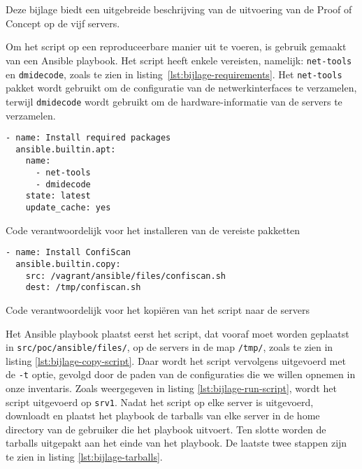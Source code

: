 
\chapter{}
\label{ch:bijlage_poc_uitvoering}

Deze bijlage biedt een uitgebreide beschrijving van de uitvoering van de Proof of Concept op de vijf servers.

Om het script op een reproduceerbare manier uit te voeren, is gebruik gemaakt van een Ansible playbook.
Het script heeft enkele vereisten, namelijk: \texttt{net-tools} en \texttt{dmidecode}, zoals te zien in listing~\ref{lst:bijlage-requirements}.
Het \texttt{net-tools} pakket wordt gebruikt om de configuratie van de netwerkinterfaces te verzamelen, terwijl \texttt{dmidecode} wordt gebruikt om de hardware-informatie van de servers te verzamelen.

\begin{listing}
  \begin{verbatim}
- name: Install required packages
  ansible.builtin.apt:
    name:
      - net-tools
      - dmidecode
    state: latest
    update_cache: yes
  \end{verbatim}
  \caption{Code verantwoordelijk voor het installeren van de vereiste pakketten}
  \label{lst:bijlage-requirements}
\end{listing}

\begin{listing}
  \begin{verbatim}
- name: Install ConfiScan
  ansible.builtin.copy:
    src: /vagrant/ansible/files/confiscan.sh
    dest: /tmp/confiscan.sh
  \end{verbatim}
  \caption{Code verantwoordelijk voor het kopiëren van het script naar de servers}
  \label{lst:bijlage-copy-script}
\end{listing}

Het Ansible playbook plaatst eerst het script, dat vooraf moet worden geplaatst in \texttt{src/poc/ansible/files/}, op de servers in de map \texttt{/tmp/}, zoals te zien in listing \ref{lst:bijlage-copy-script}.
Daar wordt het script vervolgens uitgevoerd met de \texttt{-t} optie, gevolgd door de paden van de configuraties die we willen opnemen in onze inventaris.
Zoals weergegeven in listing \ref{lst:bijlage-run-script}, wordt het script uitgevoerd op \texttt{srv1}.
Nadat het script op elke server is uitgevoerd, downloadt en plaatst het playbook de tarballs van elke server in de home directory van de gebruiker die het playbook uitvoert.
Ten slotte worden de tarballs uitgepakt aan het einde van het playbook.
De laatste twee stappen zijn te zien in listing \ref{lst:bijlage-tarballs}.

